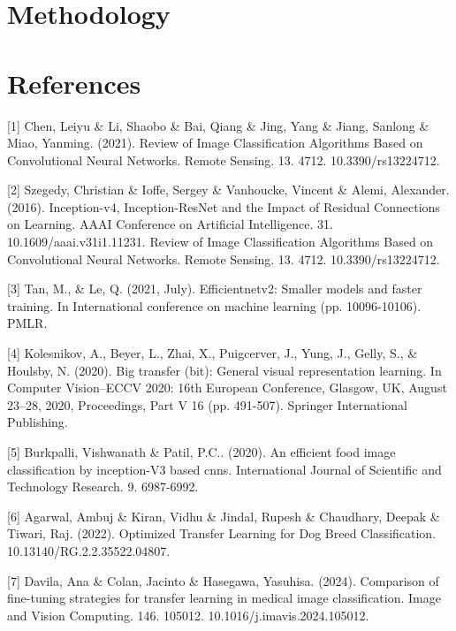 \documentclass{article}
\begin{document}
\section{Methodology}

\section*{References}

\medskip

{
\small

[1] Chen, Leiyu \& Li, Shaobo \& Bai, Qiang \& Jing, Yang \& Jiang, Sanlong \& Miao, Yanming. (2021). 
Review of Image Classification Algorithms Based on Convolutional Neural Networks. Remote Sensing. 13. 4712. 10.3390/rs13224712.

[2] Szegedy, Christian \& Ioffe, Sergey \& Vanhoucke, Vincent \& Alemi, Alexander. (2016). Inception-v4, 
Inception-ResNet and the Impact of Residual Connections on Learning. AAAI Conference on Artificial Intelligence. 31. 10.1609/aaai.v31i1.11231.  
Review of Image Classification Algorithms Based on Convolutional Neural Networks. Remote Sensing. 13. 4712. 10.3390/rs13224712.

[3] Tan, M., \& Le, Q. (2021, July). Efficientnetv2: Smaller models and faster training. In International 
conference on machine learning (pp. 10096-10106). PMLR.

[4] Kolesnikov, A., Beyer, L., Zhai, X., Puigcerver, J., Yung, J., Gelly, S., \& Houlsby, N. (2020). Big transfer (bit): 
General visual representation learning. In Computer Vision–ECCV 2020: 16th European Conference, Glasgow, UK, August 23–28, 2020, 
Proceedings, Part V 16 (pp. 491-507). Springer International Publishing.

[5] Burkpalli, Vishwanath \& Patil, P.C.. (2020). An efficient food image classification by inception-V3 based cnns. 
International Journal of Scientific and Technology Research. 9. 6987-6992. 

[6] Agarwal, Ambuj \& Kiran, Vidhu \& Jindal, Rupesh \& Chaudhary, Deepak \& Tiwari, Raj. (2022). 
Optimized Transfer Learning for Dog Breed Classification. 10.13140/RG.2.2.35522.04807. 

[7] Davila, Ana \& Colan, Jacinto \& Hasegawa, Yasuhisa. (2024). Comparison of fine-tuning strategies for transfer learning in 
medical image classification. Image and Vision Computing. 146. 105012. 10.1016/j.imavis.2024.105012. 
}
\end{document}
